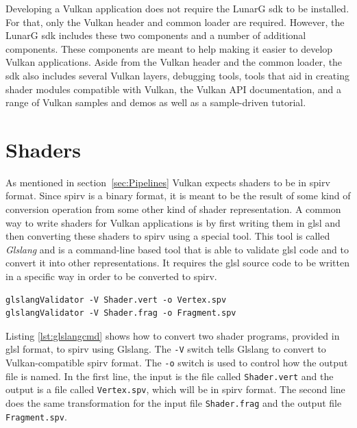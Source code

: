     Developing a Vulkan application does not require the LunarG \gls{sdk} to be installed. For that, only the Vulkan header and common loader are required. However, the LunarG \gls{sdk} includes these two components and a number of additional components. These components are meant to help making it easier to develop Vulkan applications. Aside from the Vulkan header and the common loader, the \gls{sdk} also includes several Vulkan layers, debugging tools, tools that aid in creating shader modules compatible with Vulkan, the Vulkan API documentation, and a range of Vulkan samples and demos as well as a sample-driven tutorial.


  \section{Shaders}
  \label{sec:EnvShaders}
    As mentioned in section~\ref{sec:Pipelines} Vulkan expects shaders to be in \gls{spirv} format. Since \gls{spirv} is a binary format, it is meant to be the result of some kind of conversion operation from some other kind of shader representation.  A common way to write shaders for Vulkan applications is by first writing them in \gls{glsl} and then converting these shaders to \gls{spirv} using a special tool. This tool is called \textit{Glslang}\cite{glslangrepo} and is a command-line based tool that is able to validate \gls{glsl} code and to convert it into other representations. It requires the \gls{glsl} source code to be written in a specific way in order to be converted to \gls{spirv}.


    \begin{lstlisting}[label=lst:glslangcmd, caption=foo]
glslangValidator -V Shader.vert -o Vertex.spv
glslangValidator -V Shader.frag -o Fragment.spv\end{lstlisting}


    Listing \ref{lst:glslangcmd} shows how to convert two shader programs, provided in \gls{glsl} format, to \gls{spirv} using Glslang. The \lstinline{-V} switch tells Glslang to convert to Vulkan-compatible \gls{spirv} format. The \lstinline{-o} switch is used to control how the output file is named. In the first line, the input is the file called \lstinline{Shader.vert} and the output is a file called \lstinline{Vertex.spv}, which will be in \gls{spirv} format. The second line does the same transformation for the input file \lstinline{Shader.frag} and the output file \lstinline{Fragment.spv}.

